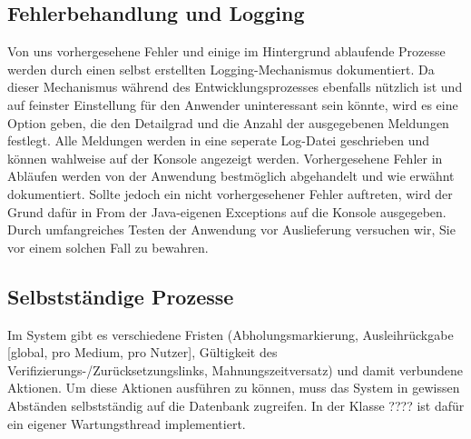 \documentclass{article}
\begin{document}
\subsection{Fehlerbehandlung und Logging}
Von uns vorhergesehene Fehler und einige im Hintergrund ablaufende Prozesse werden durch einen selbst erstellten Logging-Mechanismus dokumentiert. Da dieser Mechanismus während des Entwicklungsprozesses ebenfalls nützlich ist und auf feinster Einstellung für den Anwender uninteressant sein könnte, wird es eine Option geben, die den Detailgrad und die Anzahl der ausgegebenen Meldungen festlegt. Alle Meldungen werden in eine seperate Log-Datei geschrieben und können wahlweise auf der Konsole angezeigt werden. Vorhergesehene Fehler in Abläufen werden von der Anwendung bestmöglich abgehandelt und wie erwähnt dokumentiert. Sollte jedoch ein nicht vorhergesehener Fehler auftreten, wird der Grund dafür in From der Java-eigenen Exceptions auf die Konsole ausgegeben. Durch umfangreiches Testen der Anwendung vor Auslieferung versuchen wir, Sie vor einem solchen Fall zu bewahren.
\subsection{Selbstständige Prozesse}
Im System gibt es verschiedene Fristen (Abholungsmarkierung, Ausleihrückgabe [global, pro Medium, pro Nutzer], Gültigkeit des Verifizierungs-/Zurücksetzungslinks, Mahnungszeitversatz) und damit verbundene Aktionen. Um diese Aktionen ausführen zu können, muss das System in gewissen Abständen selbstständig auf die Datenbank zugreifen. In der Klasse ???? ist dafür ein eigener Wartungsthread implementiert.
\end{document}
